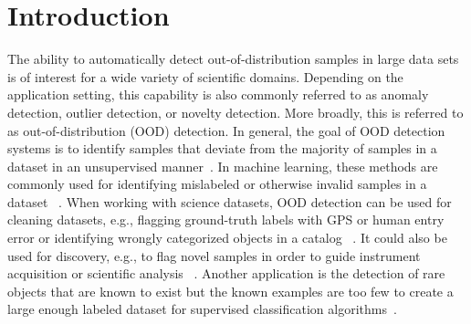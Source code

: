 \documentclass[utf8]{frontiersFPHY} %
\begin{document}
\section{Introduction}

The ability to automatically detect out-of-distribution samples in large data 
sets is of interest for a wide variety of scientific domains. Depending on the
application setting, this capability is also commonly referred to as anomaly
detection, outlier detection, or novelty detection. More broadly, this is 
referred to as out-of-distribution (OOD) detection. In general, the goal of 
OOD detection systems is to identify samples that deviate from the majority
of samples in a dataset in an unsupervised manner~\cite{pimentel2014review}. 
In machine learning, these methods are commonly used for identifying 
mislabeled or otherwise invalid samples in a dataset 
~\citep{liang2018enhancing,bohm2020probabilistic}. 
%
When working with science datasets, OOD detection can be used for 
cleaning datasets, e.g., flagging ground-truth labels with GPS or human
entry error or identifying wrongly categorized objects in a catalog
~\citep{wagstaff:des-anom20,lochner2021astronomaly}. 
It could also be used for discovery, e.g., to flag novel samples in order 
to guide instrument acquisition or scientific analysis
~\citep{wagstaff:demud13,wagstaff:rover-novelty20,
kerner2020comparison,kerner2020analysis}.
Another application
is the detection of rare objects that are known to exist but the known
examples are too few to create a large enough labeled dataset for 
supervised classification algorithms~\citep{chang2002anomaly,zhou2016novel}. 
\end{document}
